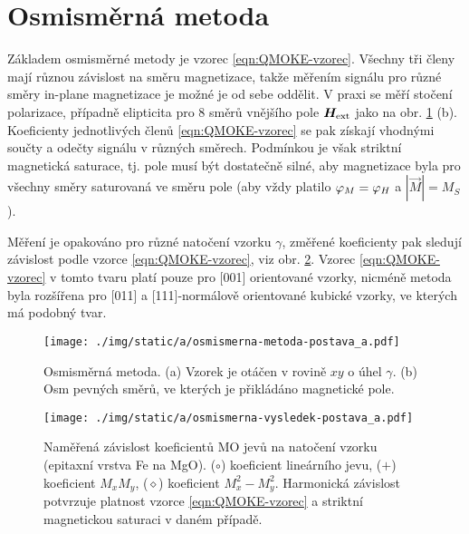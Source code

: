 \section{Osmisměrná metoda}
\label{chap:osmismerna-metoda}

Základem osmisměrné metody\cite{postavaAnisotropyQuadraticMagnetooptic2002} je vzorec \eqref{eqn:QMOKE-vzorec}.
Všechny tři členy mají různou závislost na směru magnetizace, takže měřením signálu pro různé směry in-plane magnetizace je možné je od sebe oddělit.
V praxi se měří stočení polarizace, případně elipticita pro 8 směrů vnějšího pole $\bm{H}_\textrm{ext}$ jako na obr. \ref{fig:osmismerna-metoda} (b).
Koeficienty jednotlivých členů \eqref{eqn:QMOKE-vzorec} se pak získají vhodnými součty a odečty signálu v různých směrech.
Podmínkou je však striktní magnetická saturace, tj. pole musí být dostatečně silné, aby magnetizace byla pro všechny směry saturovaná ve směru pole (aby vždy platilo $\varphi_M=\varphi_H$ a $|\vec{M}|=M_S$).

Měření je opakováno pro různé natočení vzorku $\gamma$, změřené koeficienty pak sledují závislost podle vzorce \eqref{eqn:QMOKE-vzorec}, viz obr. \ref{fig:osmismerna-vysledky}.
Vzorec \eqref{eqn:QMOKE-vzorec} v tomto tvaru platí pouze pro [001] orientované vzorky, nicméně metoda byla rozšířena pro [011] a [111]-normálově orientované kubické vzorky, ve kterých má podobný tvar\cite{silberQuadraticMagnetoopticKerr2019a,hamrlovaQuadraticinmagnetizationPermittivityConductivity2013}.

\begin{figure}[htbp]
    \centering
    \texttt{[image: ./img/static/a/osmismerna-metoda-postava\_a.pdf]}
    \caption{Osmisměrná metoda. (a) Vzorek je otáčen v rovině $xy$ o úhel $\gamma$. (b) Osm pevných směrů, ve kterých je přikládáno magnetické pole. \cite{postavaAnisotropyQuadraticMagnetooptic2002}}
    \label{fig:osmismerna-metoda}
\end{figure}

\begin{figure}[htbp]
    \centering
    \texttt{[image: ./img/static/a/osmismerna-vysledek-postava\_a.pdf]}
    \caption{Naměřená závislost koeficientů MO jevů na natočení vzorku (epitaxní vrstva Fe na MgO). ($\circ$) koeficient lineárního jevu, ($+$) koeficient $M_xM_y$, ($\diamond$) koeficient $M_x^2-M_y^2$. Harmonická závislost potvrzuje platnost vzorce \eqref{eqn:QMOKE-vzorec} a striktní magnetickou saturaci v daném případě. \cite{postavaAnisotropyQuadraticMagnetooptic2002}}
    \label{fig:osmismerna-vysledky}
\end{figure}
